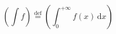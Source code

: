 \[ 
\left(\int f\right)
\stackrel{\textrm{def}}{=}
\left( \int_0^{+\infty} 
\!\!\!f(x)\,\textrm{d}x \right)
\]

